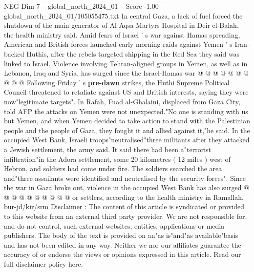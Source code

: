 \begin{textsample}{NEG Dim 7 – global\_north\_2024\_01 – Score -1.00 – global\_north\_2024\_01/105055475.txt}
In central Gaza, a lack of fuel forced the shutdown of the main generator of Al Aqsa Martyrs Hospital in Deir el-Balah, the health ministry said.
Amid fears of Israel ' s war against Hamas spreading, American and British forces launched early morning raids against Yemen ' s Iran-backed Huthis, after the rebels targeted shipping in the Red Sea they said was linked to Israel.
Violence involving Tehran-aligned groups in Yemen, as well as in Lebanon, Iraq and Syria, has surged since the Israel-Hamas war @ @ @ @ @ @ @ @ @ @ Following Friday ' s \textbf{pre-dawn} strikes, the Huthi Supreme Political Council threatened to retaliate against US and British interests, saying they were now"legitimate targets".
In Rafah, Fuad al-Ghalaini, displaced from Gaza City, told AFP the attacks on Yemen were not unexpected."No one is standing with us but Yemen, and when Yemen decided to take action to stand with the Palestinian people and the people of Gaza, they fought it and allied against it,"he said.
In the occupied West Bank, Israeli troops"neutralised"three militants after they attacked a Jewish settlement, the army said.
It said there had been a"terrorist infiltration"in the Adora settlement, some 20 kilometres ( 12 miles ) west of Hebron, and soldiers had come under fire.
The soldiers searched the area and"three assailants were identified and neutralised by the security forces".
Since the war in Gaza broke out, violence in the occupied West Bank has also surged @ @ @ @ @ @ @ @ @ @ or settlers, according to the health ministry in Ramallah. bur-jd/kir/srm Disclaimer : The content of this article is syndicated or provided to this website from an external third party provider.
We are not responsible for, and do not control, such external websites, entities, applications or media publishers.
The body of the text is provided on an"as is"and"as available"basis and has not been edited in any way.
Neither we nor our affiliates guarantee the accuracy of or endorse the views or opinions expressed in this article.
Read our full disclaimer policy here.

\end{textsample}
